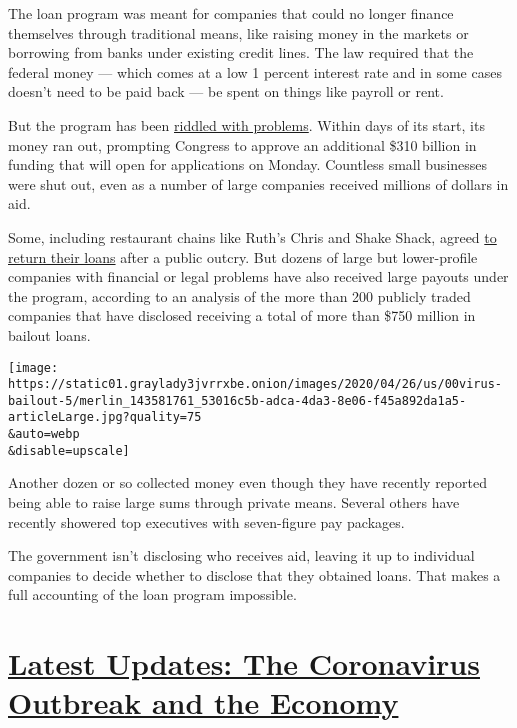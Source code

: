 The loan program was meant for companies that could no longer finance
themselves through traditional means, like raising money in the markets
or borrowing from banks under existing credit lines. The law required
that the federal money --- which comes at a low 1 percent interest rate
and in some cases doesn't need to be paid back --- be spent on things
like payroll or rent.

But the program has been
\href{https://www.nytimes3xbfgragh.onion/2020/04/26/business/ppp-small-business-loans.html}{riddled
with problems}. Within days of its start, its money ran out, prompting
Congress to approve an additional \$310 billion in funding that will
open for applications on Monday. Countless small businesses were shut
out, even as a number of large companies received millions of dollars in
aid.

Some, including restaurant chains like Ruth's Chris and Shake Shack,
agreed
\href{https://www.nytimes3xbfgragh.onion/2020/04/20/business/shake-shack-returning-loan-ppp-coronavirus.html}{to
return their loans} after a public outcry. But dozens of large but
lower-profile companies with financial or legal problems have also
received large payouts under the program, according to an analysis of
the more than 200 publicly traded companies that have disclosed
receiving a total of more than \$750 million in bailout loans.

\texttt{[image: https://static01.graylady3jvrrxbe.onion/images/2020/04/26/us/00virus-bailout-5/merlin\_143581761\_53016c5b-adca-4da3-8e06-f45a892da1a5-articleLarge.jpg?quality=75\\\&auto=webp\\\&disable=upscale]}

Another dozen or so collected money even though they have recently
reported being able to raise large sums through private means. Several
others have recently showered top executives with seven-figure pay
packages.

The government isn't disclosing who receives aid, leaving it up to
individual companies to decide whether to disclose that they obtained
loans. That makes a full accounting of the loan program impossible.

\hypertarget{latest-updates-the-coronavirus-outbreak-and-the-economy}{%
\section{\texorpdfstring{\href{https://www.nytimes3xbfgragh.onion/live/2020/08/17/business/stock-market-today-coronavirus?action=click\&pgtype=Article\&state=default\&region=MAIN_CONTENT_1\&context=storylines_live_updates}{Latest
Updates: The Coronavirus Outbreak and the
Economy}}{Latest Updates: The Coronavirus Outbreak and the Economy}}\label{latest-updates-the-coronavirus-outbreak-and-the-economy}}

